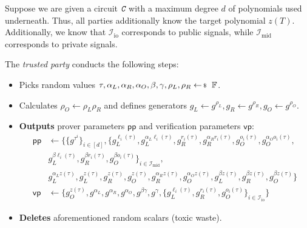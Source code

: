 \documentclass[../../book.tex]{subfiles}
\begin{document}
\begin{tcolorbox}[title=Pinocchio Protocol,
    breakable,
    colback=blue!5!white,
    colframe=blue!75!black,
    colbacktitle=blue!25!white,
    coltitle=blue!20!black,
    fonttitle=\bfseries,
    boxrule=1.25pt,
    subtitle style={boxrule=0pt,
    colback=blue!20!white,
    colupper=blue!75!gray} ]
    \small
    Suppose we are given a circuit $\textit{\texttt{C}}$ with a maximum degree $d$ of polynomials used underneath. Thus, all parties additionally know the target polynomial $z(T)$. Additionally, we know that $\mathcal{I}_{\text{io}}$ corresponds to public signals, while $\mathcal{I}_{\text{mid}}$ corresponds to private signals.

    The \emph{trusted party} conducts the following steps:
    \begin{itemize}[label=]
        \item Picks random values $\tau, \alpha_L, \alpha_R, \alpha_O, \beta, \gamma, \rho_L, \rho_R \leftarrowS \mathbb{F}$.
        \item Calculates $\rho_O \gets \rho_L\rho_R$ and defines generators $g_L \gets g^{\rho_L}, g_R \gets g^{\rho_R}, g_O \gets g^{\rho_O}$.
        \item \textbf{Outputs} prover parameters $\mathsf{pp}$ and verification parameters $\mathsf{vp}$:
        \begin{align*}
            \mathsf{pp} &\gets \big\{\{g^{\tau^i}\}_{i \in [d]}, \{g_L^{\ell_i(\tau)}, g_L^{\alpha_L\ell_i(\tau)}, g_R^{r_i(\tau)}, g_R^{\alpha_Rr_i(\tau)}, g_O^{o_i(\tau)}, g_O^{\alpha_O o_i(\tau)}, \\ 
            & g_L^{\beta \ell_i(\tau)}, g_R^{\beta r_i(\tau)}, g_O^{\beta o_i(\tau)}\}_{i \in \mathcal{I}_{\text{mid}}}, \\ 
            & g_L^{\alpha_L z(\tau)}, g_L^{z(\tau)}, g_R^{z(\tau)}, g_O^{z(\tau)}, g_R^{\alpha_R z(\tau)}, g_O^{\alpha_O z(\tau)}, g_L^{\beta z(\tau)}, g_R^{\beta z(\tau)}, g_O^{\beta z(\tau)}\big\} \\
            \mathsf{vp} &\gets \big\{ g_O^{z(\tau)}, g^{\alpha_L}, g^{\alpha_R}, g^{\alpha_O}, g^{\beta\gamma}, g^{\gamma}, \{g_L^{\ell_i(\tau)}, g_R^{r_i(\tau)}, g_O^{o_i(\tau)}\}_{i \in \mathcal{I}_{\text{io}}} \big\}
        \end{align*}
        \item \textbf{Deletes} aforementioned random scalars (toxic waste).
    \end{itemize}

\end{tcolorbox}
\end{document}
